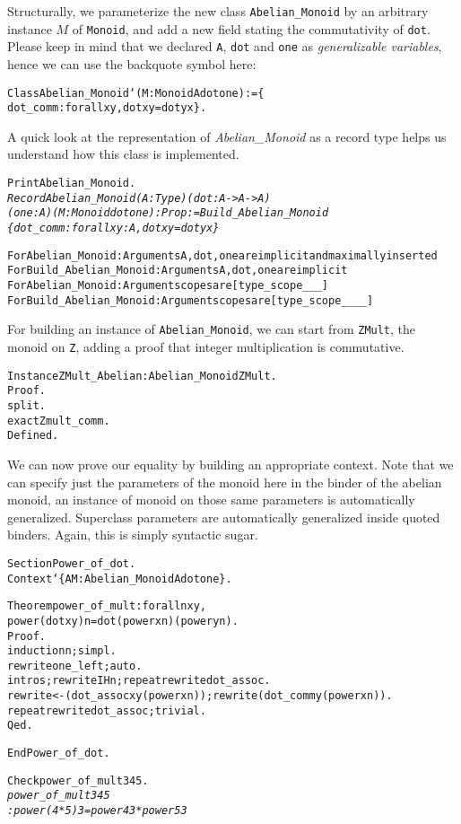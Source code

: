 \documentclass[a4]{report}
\begin{document}
Structurally, we parameterize the new class \texttt{Abelian\_Monoid}
by an arbitrary instance $M$ of \texttt{Monoid}, and add a new field
stating the commutativity of \texttt{dot}. Please keep in mind that
we declared \texttt{A}, \texttt{dot} and \texttt{one} as
\emph{generalizable variables}, hence we can use the backquote symbol here:

\begin{alltt}
Class Abelian_Monoid `(M:Monoid A dot one) := \{
  dot_comm : forall x y, dot x y = dot y x\}.
\end{alltt}

A quick look at the representation of \emph{Abelian\_Monoid} as a record type
helps us understand how this class is implemented.

  \begin{alltt}
Print Abelian_Monoid.\it\color{red}
Record Abelian_Monoid (A : Type) (dot : A -> A -> A) 
(one : A) (M : Monoid dot one) : Prop := Build_Abelian_Monoid
  \{ dot_comm : forall x y : A, dot x y = dot y x \}

For Abelian_Monoid: Arguments A, dot, one are implicit and maximally inserted
For Build_Abelian_Monoid: Arguments A, dot, one are implicit
For Abelian_Monoid: Argument scopes are [type_scope _ _ _]
For Build_Abelian_Monoid: Argument scopes are [type_scope _ _ _ _]
\end{alltt}


For building an instance of \texttt{Abelian\_Monoid}, we can start 
from \texttt{ZMult}, the monoid on \texttt{Z}, adding a proof that
integer multiplication is commutative.

\begin{alltt}
Instance ZMult_Abelian : Abelian_Monoid ZMult.
Proof.
  split. 
  exact Zmult_comm.
Defined.
\end{alltt}

We can now prove our equality by building an appropriate context.
Note that we can specify just the parameters of the monoid here in the
binder of the abelian monoid, an instance of monoid on those same
parameters is automatically generalized. Superclass parameters are
automatically generalized inside quoted binders. Again, this is simply
syntactic sugar.

\begin{alltt}
Section Power_of_dot.
  Context `\{AM:Abelian_Monoid A dot one\}.

  Theorem power_of_mult : forall n x y, 
      power (dot x y) n = dot (power x n) (power y n). 
  Proof.
    induction n;simpl.
    rewrite one_left;auto.
    intros; rewrite IHn; repeat rewrite dot_assoc.
    rewrite <- (dot_assoc x y (power x n)); rewrite (dot_comm y (power x n)).
    repeat rewrite dot_assoc;trivial.
  Qed.

End Power_of_dot.

Check power_of_mult 3 4 5.\it\color{red}
power_of_mult 3 4 5
     : power (4 * 5) 3 = power 4 3 * power 5 3
\end{alltt} 
\end{document}
